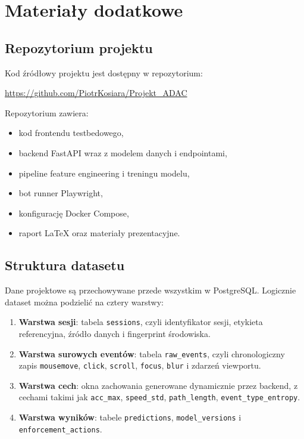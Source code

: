 \section{Materiały dodatkowe}

\subsection{Repozytorium projektu}
Kod źródłowy projektu jest dostępny w repozytorium:
\begin{center}
  \url{https://github.com/PiotrKosiara/Projekt_ADAC}
\end{center}

Repozytorium zawiera:
\begin{itemize}
  \item kod frontendu testbedowego,
  \item backend FastAPI wraz z modelem danych i endpointami,
  \item pipeline feature engineering i treningu modelu,
  \item bot runner Playwright,
  \item konfigurację Docker Compose,
  \item raport LaTeX oraz materiały prezentacyjne.
\end{itemize}

\subsection{Struktura datasetu}
Dane projektowe są przechowywane przede wszystkim w PostgreSQL. Logicznie dataset
można podzielić na cztery warstwy:
\begin{enumerate}
  \item \textbf{Warstwa sesji}: tabela \texttt{sessions}, czyli identyfikator sesji,
  etykieta referencyjna, źródło danych i fingerprint środowiska.
  \item \textbf{Warstwa surowych eventów}: tabela \texttt{raw\_events}, czyli
  chronologiczny zapis \texttt{mousemove}, \texttt{click}, \texttt{scroll},
  \texttt{focus}, \texttt{blur} i zdarzeń viewportu.
  \item \textbf{Warstwa cech}: okna zachowania generowane dynamicznie przez backend,
  z cechami takimi jak \texttt{acc\_max}, \texttt{speed\_std},
  \texttt{path\_length}, \texttt{event\_type\_entropy}.
  \item \textbf{Warstwa wyników}: tabele \texttt{predictions},
  \texttt{model\_versions} i \texttt{enforcement\_actions}.
\end{enumerate}

